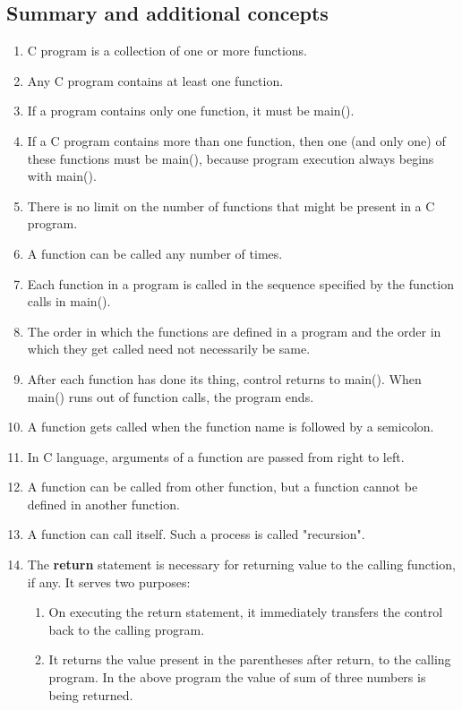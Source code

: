 \subsection{Summary and additional concepts}
\begin{enumerate}
    \item C program is a collection of one or more functions.
    \item Any C program contains at least one function.
    \item If a program contains only one function, it must be main().
    \item If a C program contains more than one function, then one (and only one) of these functions must be main(), because program execution always begins with main().
    \item There is no limit on the number of functions that might be present in a C program.
    \item A function can be called any number of times.
    \item Each function in a program is called in the sequence specified by the function calls in main().
    \item The order in which the functions are defined in a program and the order in which they get called need not necessarily be same.
    \item After each function has done its thing, control returns to main(). When main() runs out of function calls, the program ends.
    \item A function gets called when the function name is followed by a semicolon.
    \item In C language, arguments of a function are passed from right to left.
    \item A function can be called from other function, but a function cannot be defined in another function.
    \item A function can call itself. Such a process is called "recursion".
    \item The \textbf{return} statement is necessary for returning value to the calling function, if any. It serves two purposes: 
    \begin{enumerate}
        \item On executing the return statement, it immediately transfers the control back to the calling program.
        \item It returns the value present in the parentheses after return, to the calling program. In the above program the value of sum of three numbers is being returned.

\end{enumerate}
\end{enumerate}
